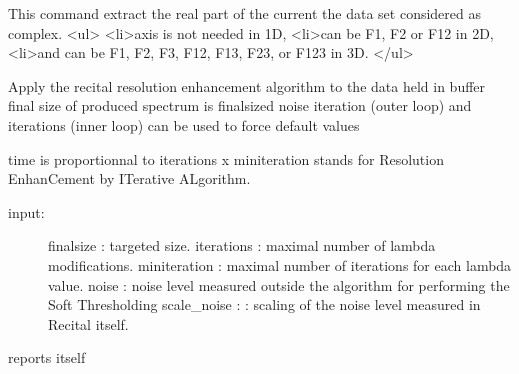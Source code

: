 \documentclass[letterpaper,10pt,openany,oneside]{sphinxmanual}
\begin{document}
\begin{fulllineitems}
\begin{fulllineitems}
\end{fulllineitems}


\begin{fulllineitems}
\label{rst/code:NPKData.NPKData.real}
This command extract the real part of the current the data set 
considered as complex.
\textless{}ul\textgreater{}
\textless{}li\textgreater{}axis is not needed in 1D, 
\textless{}li\textgreater{}can be F1, F2 or F12 in 2D,
\textless{}li\textgreater{}and can be F1, F2, F3, F12, F13, F23, or F123 in 3D.
\textless{}/ul\textgreater{}

\end{fulllineitems}


\begin{fulllineitems}
\label{rst/code:NPKData.NPKData.recital}
Apply the recital resolution enhancement algorithm to the data held in buffer
final size of produced spectrum is finalsized
noise iteration (outer loop) and iterations (inner loop) can be used to force default values

time is proportionnal to iterations x miniteration
stands for Resolution EnhanCement by ITerative ALgorithm.
\begin{description}
\item[{input:}] \leavevmode
finalsize : targeted size.
iterations : maximal number of lambda modifications.
miniteration : maximal number of iterations for each lambda value.
noise : noise level measured outside the algorithm for performing the Soft Thresholding
scale\_noise : : scaling of the noise level measured in Recital itself.

\end{description}

\end{fulllineitems}


\begin{fulllineitems}
\label{rst/code:NPKData.NPKData.report}
reports itself

\end{fulllineitems}


\end{fulllineitems}
\end{document}
